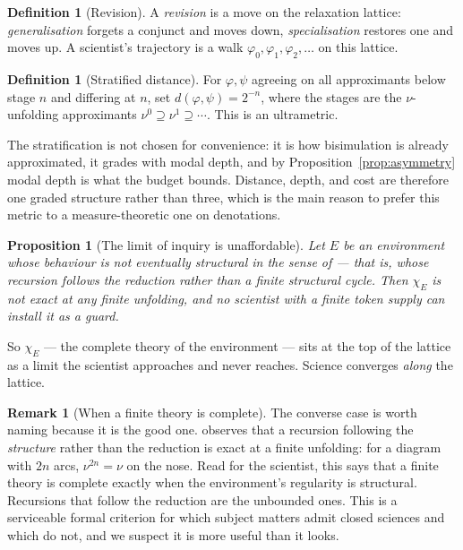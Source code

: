 \documentclass[11pt]{article}
\theoremstyle{plain}
\newtheorem{proposition}[theorem]{Proposition}
\theoremstyle{definition}
\newtheorem{definition}[theorem]{Definition}
\newtheorem{remark}[theorem]{Remark}
\begin{document}
\begin{definition}[Revision]
A \emph{revision} is a move on the relaxation lattice: \emph{generalisation} forgets a conjunct and
moves down, \emph{specialisation} restores one and moves up. A scientist's trajectory is a walk
$\varphi_0, \varphi_1, \varphi_2, \ldots$ on this lattice.
\end{definition}

\begin{definition}[Stratified distance]
For $\varphi, \psi$ agreeing on all approximants below stage $n$ and differing at $n$, set
$d(\varphi, \psi) = 2^{-n}$, where the stages are the $\nu$-unfolding approximants
$\nu^0 \supseteq \nu^1 \supseteq \cdots$. This is an ultrametric.
\end{definition}

The stratification is not chosen for convenience: it is how bisimulation is already approximated, it
grades with modal depth, and by Proposition~\ref{prop:asymmetry} modal depth is what the budget
bounds. Distance, depth, and cost are therefore one graded structure rather than three, which is the
main reason to prefer this metric to a measure-theoretic one on denotations.

\begin{proposition}[The limit of inquiry is unaffordable]
\label{prop:limit}
Let $E$ be an environment whose behaviour is not eventually structural in the sense of
\cite[Rem.~6]{ClassifierNote} --- that is, whose recursion follows the reduction rather than a finite
structural cycle. Then $\chi_E$ is not exact at any finite unfolding, and no scientist with a finite
token supply can install it as a guard.
\end{proposition}

So $\chi_E$ --- the complete theory of the environment --- sits at the top of the lattice as a limit
the scientist approaches and never reaches. Science converges \emph{along} the lattice.

\begin{remark}[When a finite theory is complete]
\label{rem:structural}
The converse case is worth naming because it is the good one. \cite[Rem.~6]{ClassifierNote} observes
that a recursion following the \emph{structure} rather than the reduction is exact at a finite
unfolding: for a diagram with $2n$ arcs, $\nu^{2n} = \nu$ on the nose. Read for the scientist, this
says that a finite theory is complete exactly when the environment's regularity is structural.
Recursions that follow the reduction are the unbounded ones. This is a serviceable formal criterion
for which subject matters admit closed sciences and which do not, and we suspect it is more useful
than it looks.
\end{remark}
\end{document}
